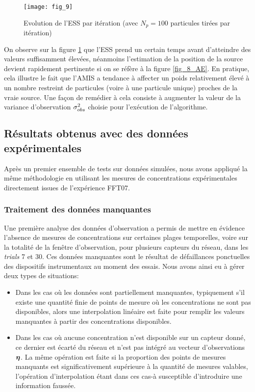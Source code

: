  \begin{figure}[h!]
 	\centering
 	\texttt{[image: fig\_9]}
 	\caption{Evolution de l'ESS par itération (avec $N_p=100$ particules tirées par itération)}
 	\label{fig_9_AE}
 \end{figure}
 
 On observe sur la figure \ref{fig_9_AE} que l'ESS prend un certain temps avant d'atteindre des valeurs suffisamment élevées, néanmoins l'estimation de la position de la source devient rapidement pertinente si on se réfère à la figure \ref{fig_8_AE}. En pratique, cela illustre le fait que l'AMIS a tendance à affecter un poids relativement élevé à un nombre restreint de particules (voire à une particule unique) proches de la vraie source. Une façon de remédier à cela consiste à augmenter la valeur de la variance d'observation ${\sigma_{obs}^2}$ choisie pour l'exécution de l'algorithme.
 
 
 \subsection{Résultats obtenus avec des données expérimentales}
 
 Après un premier ensemble de tests sur données simulées, nous avons appliqué la même méthodologie en utilisant les mesures de concentrations expérimentales directement issues de l'expérience FFT07. \\
 
 \subsubsection{Traitement des données manquantes}
 
 Une première analyse des données d'observation a permis de mettre en évidence l'absence de mesures de concentrations sur certaines plages temporelles, voire sur la totalité de la fenêtre d'observation, pour plusieurs capteurs du réseau, dans les \textit{trials} 7 et 30. Ces données manquantes sont le résultat de défaillances ponctuelles des dispositifs instrumentaux au moment des essais. Nous avons ainsi eu à gérer deux types de situations:
 
 \begin{itemize}
 	\item Dans les cas où les données sont partiellement manquantes, typiquement s'il existe une quantité finie de points de mesure où les concentrations ne sont pas disponibles, alors une interpolation linéaire est faite pour remplir les valeurs manquantes à partir des concentrations disponibles.
 	\item Dans les cas où aucune concentration n'est disponible sur un capteur donné, ce dernier est écarté du réseau et n'est pas intégré au vecteur d'observations ${\bm{\eta}}$. La même opération est faite si la proportion des points de mesures manquants est significativement supérieure à la quantité de mesures valables, l'opération d'interpolation étant dans ces cas-à susceptible d'introduire une information faussée.\\
 \end{itemize}
 

